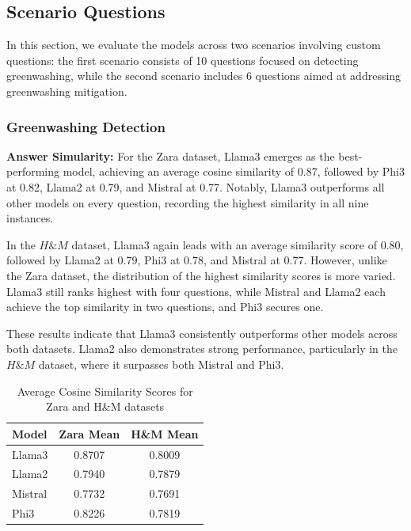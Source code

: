 \documentclass[]{article}
\begin{document}
\subsection{Scenario Questions}
In this section, we evaluate the models across two scenarios involving custom questions: 
the first scenario consists of 10 questions focused on detecting greenwashing, 
while the second scenario includes 6 questions aimed at addressing greenwashing mitigation.

\subsubsection{Greenwashing Detection}
\textbf{Answer Simularity:} 
For the Zara dataset, Llama3 emerges as the best-performing model, achieving an average cosine similarity of 0.87, followed by Phi3 at 0.82, Llama2 at 0.79, and Mistral at 0.77. Notably, Llama3 outperforms all other models on every question, recording the highest similarity in all nine instances.

In the $H\&M$ dataset, Llama3 again leads with an average similarity score of 0.80, followed by Llama2 at 0.79, Phi3 at 0.78, and Mistral at 0.77. However, unlike the Zara dataset, the distribution of the highest similarity scores is more varied. Llama3 still ranks highest with four questions, while Mistral and Llama2 each achieve the top similarity in two questions, and Phi3 secures one.

These results indicate that Llama3 consistently outperforms other models across both datasets. Llama2 also demonstrates strong performance, particularly in the $H\&M$ dataset, where it surpasses both Mistral and Phi3.

\begin{table}[H]
    \centering
    \begin{tabular}{lcc}
        \toprule
        \textbf{Model} & \textbf{Zara Mean} & \textbf{H\&M Mean} \\
        \midrule
        Llama3  & 0.8707 & 0.8009 \\
        Llama2  & 0.7940 & 0.7879 \\
        Mistral & 0.7732 & 0.7691 \\
        Phi3    & 0.8226 & 0.7819 \\
        \bottomrule
    \end{tabular}
    \caption{Average Cosine Similarity Scores for Zara and H\&M datasets}
    \label{tab:cosine_similarity}
\end{table}
\end{document}
